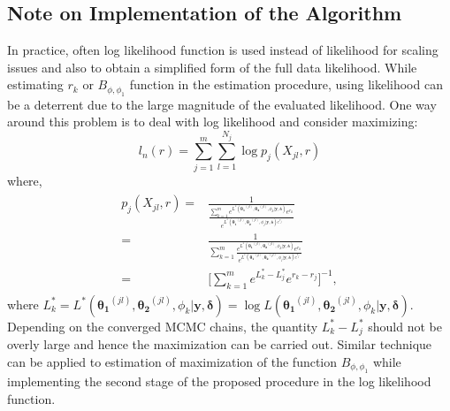 \documentclass[11pt]{article}
\theoremstyle{remboldstyle}
\newcommand{\bth}{{\boldsymbol{\theta_1}}}
\newcommand{\bthe}{{\boldsymbol{\theta_2}}}
\newcommand{\y}{{\boldsymbol{y}}}
\newcommand{\de}{{\boldsymbol{\delta}}}
\begin{document}
\subsection{Note on Implementation of the Algorithm}
\noindent
In practice, often log likelihood function is used instead of likelihood for scaling issues and also to obtain a simplified form of the full data likelihood. While estimating $r_k$ or $B_{\phi, \phi_1}$ function in the estimation procedure, using likelihood can be a deterrent due to the large magnitude of the evaluated likelihood. One way around this problem is to deal with log likelihood and consider maximizing:
\begin{equation}
l_n(r) = \sum\limits_{j = 1}^m\sum\limits_{l = 1}^{N_j} \log p_j(X_{jl},r)
\end{equation}
where,
\begin{align}
\begin{split}
p_j(X_{jl},r) = {} & \frac{1}{\frac{\sum\limits_{k=1}^{m} e^{L^{*}(\bth^{(jl)}, \bthe^{(jl)}, \phi_k| \y, \de)}e^{r_k}}  {e^{L^{*}(\bth^{(jl)}, \bthe^{(jl)}, \phi_j| \y, \de)e^{r_j}}}}\\
= & \frac{1}{\sum\limits_{k=1}^{m} \frac{ e^{L^{*}(\bth^{(jl)}, \bthe^{(jl)}, \phi_k| \y, \de)}e^{r_k}}  {e^{L^{*}(\bth^{(jl)}, \bthe^{(jl)}, \phi_j| \y, \de)e^{r_j}}}}\\
= & \bigg[\sum\limits_{k=1}^{m} e^{L^*_k - L^*_j} e^{r_k - r_j}\bigg]^{-1},
\end{split}
\end{align}
where $L^*_k = L^{*}(\bth^{(jl)}, \bthe^{(jl)}, \phi_k| \y, \de) = \log  L(\bth^{(jl)}, \bthe^{(jl)}, \phi_k| \y, \de)$. Depending on the converged MCMC chains, the quantity $L^*_k - L^*_j$ should not be overly large and hence the maximization can be carried out. Similar technique can be applied to estimation of maximization of the function $B_{\phi, \phi_1}$ while implementing the second stage of the proposed procedure in the log likelihood function. 
\end{document}
